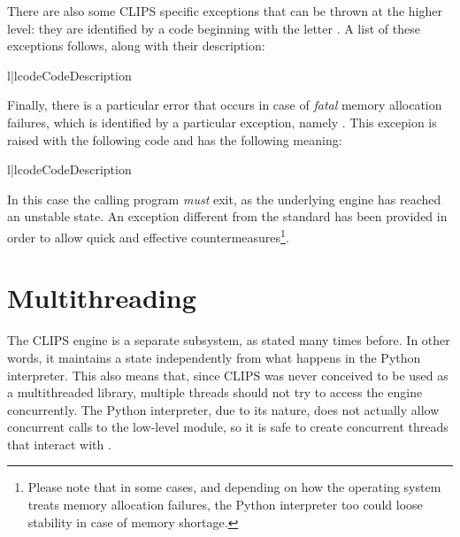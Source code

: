 There are also some CLIPS specific exceptions that can be thrown at the
higher level: they are identified by a code beginning with the letter
. A list of these exceptions follows, along with their
description:

\begin{tableii}{l|l}{code}{Code}{Description}
\end{tableii}

Finally, there is a particular error that occurs in case of \emph{fatal}
memory allocation failures, which is identified by a particular
exception, namely . This excepion is raised
with the following code and has the following meaning:

\begin{tableii}{l|l}{code}{Code}{Description}
\end{tableii}

In this case the calling program \emph{must} exit, as the underlying
engine has reached an unstable state. An exception different from the
standard  has been provided in order to allow
quick and effective countermeasures\footnote{Please note that in some
cases, and depending on how the operating system treats memory
allocation failures, the Python interpreter too could loose stability
in case of memory shortage.}.



\chapter{Multithreading\label{pyclips-threading}}

The CLIPS engine is a separate subsystem, as stated many times before.
In other words, it maintains a state independently from what happens in
the Python interpreter. This also means that, since CLIPS was never
conceived to be used as a multithreaded library, multiple threads should
not try to access the engine concurrently. The Python interpreter, due
to its nature, does not actually allow concurrent calls to the low-level
module, so it is safe to create concurrent threads that interact with
\pyclips{}.

